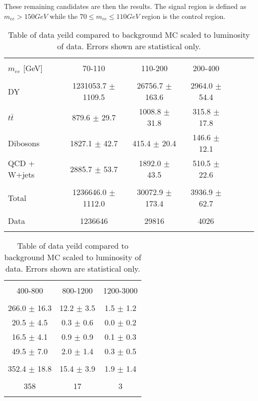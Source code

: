 These remaining candidates are then the results. The signal region is defined as $m_{ee} > 150 GeV$ while the $70 \leq m_{ee} \leq 110 GeV$ region is the control region.


\begin{table}[h!]
\centering %
\begin{tabular}{l cccccc} %
\hline\hline \\[-2ex] %
$m_{ee}$ [GeV] & 70-110 & 110-200 & 200-400 \\  [0.2ex]
\hline  \\[-2ex] %
DY & 1231053.7 $\pm$ 1109.5 & 26756.7 $\pm$ 163.6 & 2964.0 $\pm$ 54.4 \\ 
$t\bar{t}$ & 879.6 $\pm$ 29.7 & 1008.8 $\pm$ 31.8 & 315.8 $\pm$ 17.8 \\ 
Dibosons & 1827.1 $\pm$ 42.7 & 415.4 $\pm$ 20.4 & 146.6 $\pm$ 12.1 \\ 
QCD + W+jets & 2885.7 $\pm$ 53.7 & 1892.0 $\pm$ 43.5 & 510.5 $\pm$ 22.6 \\ [0.2ex]
\hline  \\[-2ex] %
Total & 1236646.0 $\pm$ 1112.0 & 30072.9 $\pm$ 173.4 & 3936.9 $\pm$ 62.7 \\ [0.2ex]
\hline  \\[-2ex] %
Data & 1236646 & 29816 & 4026 \\ [0.2ex]
\hline\hline  \\ %
\end{tabular}
\begin{tabular}{ccc} %
\hline\hline \\[-2ex] %
400-800 & 800-1200 & 1200-3000 \\  [0.2ex]
\hline  \\[-2ex] %
266.0 $\pm$ 16.3 & 12.2 $\pm$ 3.5 & 1.5 $\pm$ 1.2 \\ 
20.5 $\pm$ 4.5 & 0.3 $\pm$ 0.6 & 0.0 $\pm$ 0.2 \\ 
16.5 $\pm$ 4.1 & 0.9 $\pm$ 0.9 & 0.1 $\pm$ 0.3 \\ 
49.5 $\pm$ 7.0 & 2.0 $\pm$ 1.4 & 0.3 $\pm$ 0.5 \\ [0.2ex]
\hline  \\[-2ex] %
352.4 $\pm$ 18.8 & 15.4 $\pm$ 3.9 & 1.9 $\pm$ 1.4 \\ [0.2ex]
\hline  \\[-2ex] %
358 & 17 & 3 \\ [0.2ex]
\hline\hline  \\ %
\end{tabular}
\caption{Table of data yeild compared to background MC scaled to luminosity of data. Errors shown are statistical only.} %
\label{tab:dataMCyields}
\end{table}


